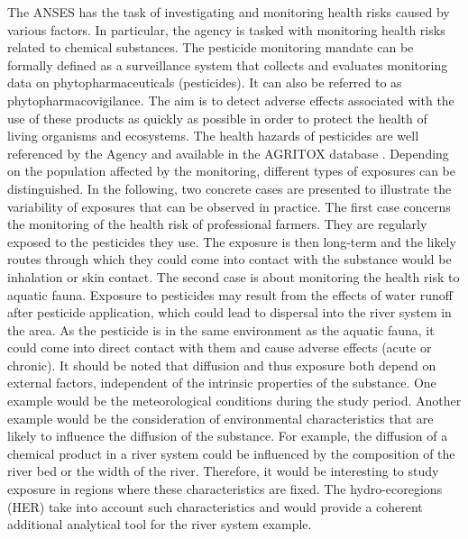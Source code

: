 The ANSES has the task of investigating and monitoring health risks caused by various factors. In particular, the agency is tasked with monitoring health risks related to chemical substances. The pesticide monitoring mandate can be formally defined as a surveillance system that collects and evaluates monitoring data on phytopharmaceuticals (pesticides). It can also be referred to as phytopharmacovigilance. The aim is to detect adverse effects associated with the use of these products as quickly as possible in order to protect the health of living organisms and ecosystems. The health hazards of pesticides are well referenced by the Agency and available in the AGRITOX database \citep{AGRITOX}. Depending on the population affected by the monitoring, different types of exposures can be distinguished. In the following, two concrete cases are presented to illustrate the variability of exposures that can be observed in practice. The first case concerns the monitoring of the health risk of professional farmers. They are regularly exposed to the pesticides they use. The exposure is then long-term and the likely routes through which they could come into contact with the substance would be inhalation or skin contact. The second case is about monitoring the health risk to aquatic fauna. Exposure to pesticides may result from the effects of water runoff after pesticide application, which could lead to dispersal into the river system in the area. As the pesticide is in the same environment as the aquatic fauna, it could come into direct contact with them and cause adverse effects (acute or chronic). It should be noted that diffusion and thus exposure both depend on external factors, independent of the intrinsic properties of the substance. One example would be the meteorological conditions during the study period. Another example would be the consideration of environmental characteristics that are likely to influence the diffusion of the substance. For example, the diffusion of a chemical product in a river system could be influenced by the composition of the river bed or the width of the river. Therefore, it would be interesting to study exposure in regions where these characteristics are fixed. The hydro-ecoregions (HER) take into account such characteristics and would provide a coherent additional analytical tool for the river system example.           

